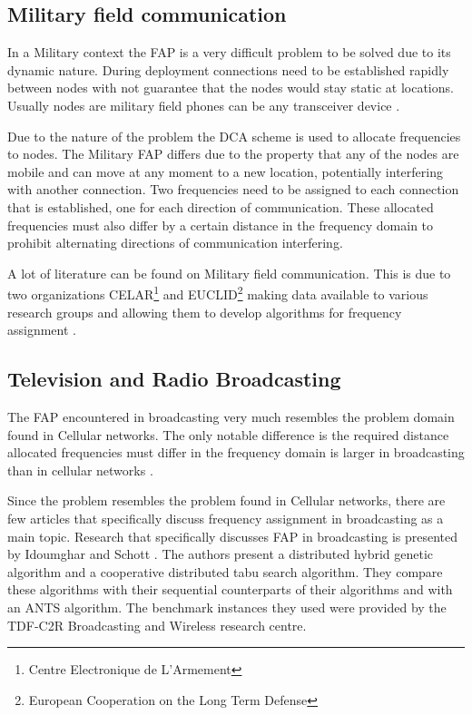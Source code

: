 \subsection{Military field communication}
In a Military context the FAP is a very difficult problem to be solved due to its dynamic nature. During deployment connections need to be established rapidly between nodes with not guarantee that the nodes would stay static at locations. Usually nodes are military field phones can be any transceiver device \cite{CALMA,DynamicFAP}. 

Due to the nature of the problem the DCA scheme is used to allocate frequencies to nodes. The Military FAP differs due to the property that any of the nodes are mobile and can move at any moment to a new location, potentially interfering with another connection\cite{CALMA,DynamicFAP}. Two frequencies need to be assigned to each connection that is established, one for each direction of communication. These allocated frequencies must also differ by a certain distance in the frequency domain to prohibit alternating directions of communication interfering\cite{CALMA,DynamicFAP}.

A lot of literature can be found on Military field communication. This is due to two organizations CELAR\footnote{Centre Electronique de L'Armement} and EUCLID\footnote{European Cooperation on the Long Term Defense} making data available to various research groups and allowing them to develop algorithms for frequency assignment \cite{CALMA,DynamicFAP}. 

\subsection{Television and Radio Broadcasting}
The FAP encountered in broadcasting very much resembles the problem domain found in Cellular networks. The only notable difference is the required distance allocated frequencies must differ in the frequency domain is larger in broadcasting than in cellular networks \cite{Karen2004}.

Since the problem resembles the problem found in Cellular networks, there are few articles that specifically discuss frequency assignment in broadcasting as a main topic. Research that specifically discusses FAP in broadcasting is presented by Idoumghar and Schott \cite{RadioFAP}. The authors present a distributed hybrid genetic algorithm and a cooperative distributed tabu search algorithm. They compare these algorithms with their sequential counterparts of their algorithms and with an ANTS algorithm. The benchmark instances they used were provided by the TDF-C2R Broadcasting and Wireless research centre.
